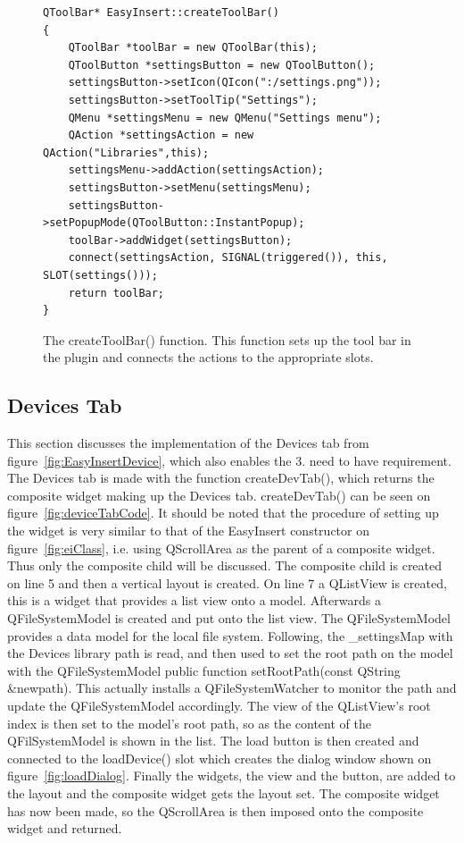 \begin{figure}[h] %
\centering
\lstset{language=C++} 
\begin{lstlisting}[frame=single] 
QToolBar* EasyInsert::createToolBar()
{ 
	QToolBar *toolBar = new QToolBar(this);
	QToolButton *settingsButton = new QToolButton();
	settingsButton->setIcon(QIcon(":/settings.png"));
	settingsButton->setToolTip("Settings");
	QMenu *settingsMenu = new QMenu("Settings menu");
	QAction *settingsAction = new QAction("Libraries",this);
	settingsMenu->addAction(settingsAction);
	settingsButton->setMenu(settingsMenu);
	settingsButton->setPopupMode(QToolButton::InstantPopup);
	toolBar->addWidget(settingsButton);
	connect(settingsAction, SIGNAL(triggered()), this, SLOT(settings()));
	return toolBar;
}
\end{lstlisting}
\caption{The createToolBar() function. This function sets up the tool bar in the plugin and connects the actions to the appropriate slots.}
\label{fig:settingsToolBarCode} 	
\end{figure}

\subsection{Devices Tab}
\label{sec:DeviceTab}
This section discusses the implementation of the Devices tab from figure~\ref{fig:EasyInsertDevice}, which also enables the 3. need to have requirement. The Devices tab is made with the function createDevTab(), which returns the composite widget making up the Devices tab. createDevTab() can be seen on figure~\ref{fig:deviceTabCode}.
It should be noted that the procedure of setting up the widget is very similar to that of the EasyInsert constructor on figure~\ref{fig:eiClass}, i.e. using QScrollArea as the parent of a composite widget. Thus only the composite child will be discussed.  The composite child is created on line 5 and then a vertical layout is created. On line 7 a QListView is created, this is a widget that provides a list view onto a model. Afterwards a QFileSystemModel is created and put onto the list view. The QFileSystemModel provides a data model for the local file system. Following, the \_settingsMap with the Devices library path is read, and then used to set the root path on the model with the QFileSystemModel public function setRootPath(const QString \&newpath). This actually installs a QFileSystemWatcher to monitor the path and update the QFileSystemModel accordingly. The view of the QListView's root index is then set to the model's root path, so as the content of the QFilSystemModel is shown in the list. The load button is then created and connected to the loadDevice() slot which creates the dialog window shown on figure~\ref{fig:loadDialog}. Finally the widgets, the view and the button, are added to the layout and the composite widget gets the layout set. The composite widget has now been made, so the QScrollArea is then imposed onto the composite widget and returned. 

